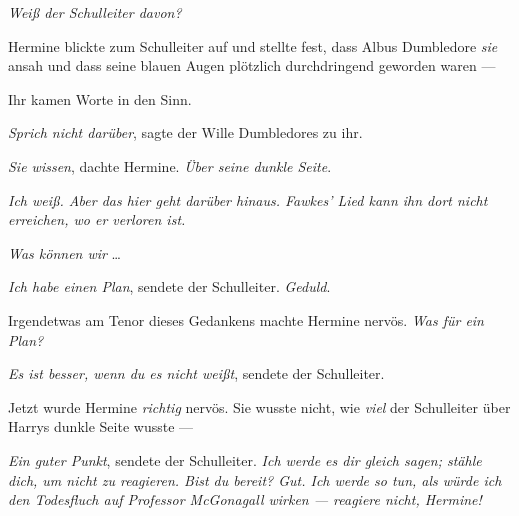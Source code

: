 \emph{Weiß der Schulleiter davon?}

Hermine blickte zum Schulleiter auf und stellte fest, dass Albus Dumbledore \emph{sie} ansah und dass seine blauen Augen plötzlich durchdringend geworden waren —

Ihr kamen Worte in den Sinn.

\emph{Sprich nicht darüber}, sagte der Wille Dumbledores zu ihr.

\emph{Sie wissen}, dachte Hermine. \emph{Über seine dunkle Seite}.

\emph{Ich weiß. Aber das hier geht darüber hinaus. Fawkes’ Lied kann ihn dort nicht erreichen, wo er verloren ist.}

\emph{Was können wir} …

\emph{Ich habe einen Plan}, sendete der Schulleiter. \emph{Geduld}.

Irgendetwas am Tenor dieses Gedankens machte Hermine nervös. \emph{Was für ein Plan?}

\emph{Es ist besser, wenn du es nicht weißt}, sendete der Schulleiter.

Jetzt wurde Hermine \emph{richtig} nervös. Sie wusste nicht, wie \emph{viel} der Schulleiter über Harrys dunkle Seite wusste —

\emph{Ein guter Punkt}, sendete der Schulleiter. \emph{Ich werde es dir gleich sagen; stähle dich, um nicht zu reagieren. Bist du bereit? Gut. Ich werde so tun, als würde ich den Todesfluch auf Professor McGonagall wirken — \emph{reagiere nicht}, Hermine!}

